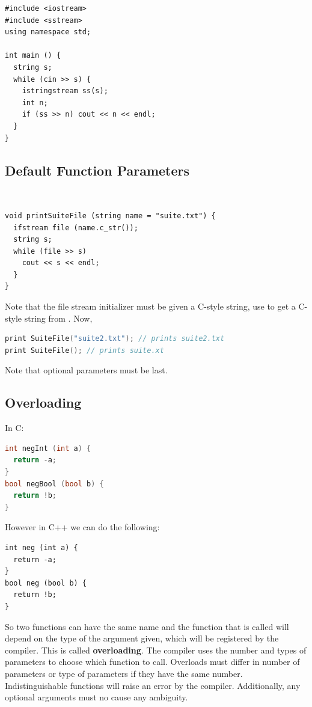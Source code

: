 \documentclass[english, 11pt]{article}
\begin{document}
\begin{lstlisting}
#include <iostream>
#include <sstream>
using namespace std;

int main () {
  string s;
  while (cin >> s) {
    istringstream ss(s);
    int n;
    if (ss >> n) cout << n << endl;
  }
}
\end{lstlisting}

\subsection{Default Function Parameters}

\begin{exmp} \
\begin{lstlisting}
void printSuiteFile (string name = "suite.txt") {
  ifstream file (name.c_str());
  string s;
  while (file >> s)
    cout << s << endl;
  }
}
\end{lstlisting}
Note that the file stream initializer must be given a C-style string, use  to get a C-style string from . Now,
\begin{lstlisting}[language=c++,numbers=none]
print SuiteFile("suite2.txt"); // prints suite2.txt
print SuiteFile(); // prints suite.xt
\end{lstlisting}
Note that optional parameters must be last.
\end{exmp}

\subsection{Overloading}

In C:
\begin{lstlisting}[language=c]
int negInt (int a) {
  return -a;
}
bool negBool (bool b) {
  return !b;
}
\end{lstlisting}
However in C++ we can do the following:
\begin{lstlisting}
int neg (int a) {
  return -a;
}
bool neg (bool b) {
  return !b;
}
\end{lstlisting}
So two functions can have the same name and the function that is called will depend on the type of the argument given, which will be registered by the compiler. This is called \textbf{overloading}. The compiler uses the number and types of parameters to choose which function to call. Overloads must differ in number of parameters or type of parameters if they have the same number. Indistinguishable functions will raise an error by the compiler. Additionally, any optional arguments must no cause any ambiguity.
\end{document}
